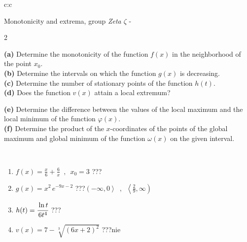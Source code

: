\documentclass[10pt]{report}
\begin{document}
\begin{tabular}{c:c}
\begin{minipage}[c][104.5mm][t]{0.5\linewidth}
\begin{center}
\vspace{5mm}
{\huge Monotonicity and extrema, group \textit{Zeta $\zeta$} -}\\[5mm]
\begin{minipage}{0.95\linewidth}
\begin{center}
{\small \begin{multicols}{2} \raggedright
\textbf{(a)} Determine the monotonicity of the function \(f(x)\) in the neighborhood of the point \(x_0\). \\[1mm]
\textbf{(b)} Determine the intervals on which the function \(g(x)\) is decreasing. \\[1mm]
\textbf{(c)} Determine the number of stationary points of the function \(h(t)\). \\[1mm]
\textbf{(d)} Does the function \(v(x)\) attain a local extremum? \par \columnbreak
\textbf{(e)} Determine the difference between the values of the local maximum and the local minimum of the function \(\varphi(x)\). \\[1mm]
\textbf{(f)} Determine the product of the \(x\)-coordinates of the points of the global maximum and global minimum of the function \(\omega(x)\) on the given interval. \\[1mm]
\end{multicols}
}
\end{center}
\end{minipage}
\\[1mm]
\begin{minipage}{0.79\linewidth}
\begin{center}
\begin{varwidth}{\linewidth}
\setlength{\itemsep}{0pt}
\begin{enumerate}
\normalsize
\item $f(x)=\frac{x}{6}+\frac{6}{x} \enspace , \enspace x_0=3$\quad \dotfill\; ???\;\dotfill \quad {}
\item $g(x)=x^2\, e^{-9x-2}$\quad \dotfill\; ???\;\dotfill \quad $\left(-\infty , 0\right\rangle\enspace , \enspace \left\langle\frac{2}{9} , \infty\right)$
\item $h(t)=\cfrac{\ln t}{6t^4}$\quad \dotfill\; ???\;\dotfill {}
\item $v(x)=7-\sqrt[3]{(6x+2)^2}$\quad \dotfill\; ???\;\dotfill \quad $\text{nie}$

\end{enumerate}
\end{varwidth}
\end{center}
\end{minipage}
\end{center}
\end{minipage}
\end{tabular}
\end{document}
